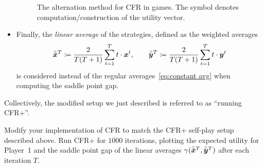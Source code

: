 \documentclass{homework}
\begin{document}
\begin{itemize}
\begin{figure}[H]
        \caption{The alternation method for CFR in games. The symbol
        \protect\computeutility{} denotes computation/construction of the utility vector.}
        \label{fig:alternation}
    \end{figure}
    \item Finally, the \emph{linear average} of the strategies, defined as the weighted averages
    \[
        \bar{\bar{\bm{x}}}^T \coloneqq \frac{2}{T(T+1)}\sum_{t=1}^T t\cdot\bm{x}^t, \qquad  
        \bar{\bar{\bm{y}}}^T \coloneqq \frac{2}{T(T+1)}\sum_{t=1}^T t\cdot\bm{y}^t  
    \]
    is considered instead of the regular averages~\eqref{eq:constant avg} when computing the saddle point gap.
\end{itemize}
Collectively, the modified setup we just described is referred to as ``running CFR+''.

\begin{problem}
    Modify your implementation of CFR to match the CFR+ self-play setup described above. Run CFR+ for $1000$ iterations, plotting the expected utility for Player~1 and the saddle point gap of the linear averages $\gamma(\bar{\bar{\bm{x}}}^T, \bar{\bar{\bm{y}}}^T)$ after each iteration $T$.
\end{problem}
\begin{solution}
\end{solution}




\end{document}
